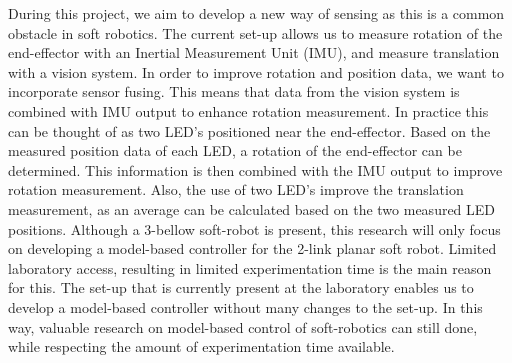 During this project, we aim to develop a new way of sensing as this is a common obstacle in soft robotics. The current set-up allows us to measure rotation of the end-effector with an Inertial Measurement Unit (IMU), and measure translation with a vision system. In order to improve rotation and position data, we want to incorporate sensor fusing. This means that data from the vision system is combined with IMU output to enhance rotation measurement. In practice this can be thought of as two LED's positioned near the end-effector. Based on the measured position data of each LED, a rotation of the end-effector can be determined. This information is then combined with the IMU output to improve rotation measurement. Also, the use of two LED's improve the translation measurement, as an average can be calculated based on the two measured LED positions.
\newpage
Although a 3-bellow soft-robot is present, this research will only focus on developing a model-based controller for the 2-link planar soft robot. Limited laboratory access, resulting in limited experimentation time is the main reason for this. The set-up that is currently present at the laboratory enables us to develop a model-based controller without many changes to the set-up. In this way, valuable research on model-based control of soft-robotics can still done, while respecting the amount of experimentation time available.





